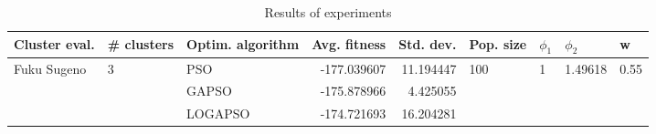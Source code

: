 \begin{table}
\centering
\caption{Results of experiments}
\begin{tabular}{lllrrllll}
\toprule
               Cluster eval. &        \# clusters & Optim. algorithm &  Avg. fitness &  Std. dev. &            Pop. size &         $\phi_{1}$ &               $\phi_{2}$ &                     w \\
\midrule
\multirow{3}{*}{Fuku Sugeno} & \multirow{3}{*}{3} &              PSO &   -177.039607 &  11.194447 & \multirow{3}{*}{100} & \multirow{3}{*}{1} & \multirow{3}{*}{1.49618} & \multirow{3}{*}{0.55} \\
                             &                    &            GAPSO &   -175.878966 &   4.425055 &                      &                    &                          &                       \\
                             &                    &          LOGAPSO &   -174.721693 &  16.204281 &                      &                    &                          &                       \\
\bottomrule
\end{tabular}
\end{table}
